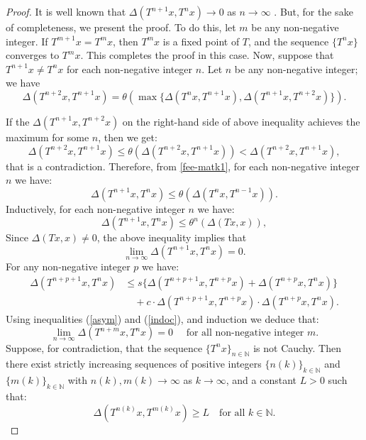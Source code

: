 \documentclass[pdflatex,sn-mathphys-num]{sn-jnl}%
\theoremstyle{thmstyleone}%
\theoremstyle{thmstyletwo}%
\theoremstyle{thmstylethree}%
\begin{document}
\begin{proof}
It is well known that \(\Delta(T^{n+1}x,T^{n}x)\to 0\) as \(n\to \infty\) \cite{hussain2018existence, karapinar2025some}. But, for the sake of completeness, we present the proof.  To do this, let \(m\) be any non-negative integer. If \(T^{m+1}x = T^m x\), then \(T^{m}x\) is a fixed point of \(T\), and the sequence \(\{T^n x\}\) converges to \(T^{m}x\). This completes the proof in this case. Now, suppose that \(T^{n+1}x \neq T^n x\) for each non-negative integer \(n\). Let \(n\) be any non-negative integer; we have
\[
\Delta(T^{n+2}x,T^{n+1}x)=\theta(\max\{\Delta(T^{n}x, T^{n+1}x),\Delta( T^{n+1}x,T^{n+2}x)\}).
\]

If the \(\Delta( T^{n+1}x,T^{n+2}x)\) on the right-hand side of above inequality achieves the maximum for some \(n\), then we get:
\[
\Delta(T^{n+2}x,T^{n+1}x)\le \theta(\Delta(T^{n+2}x,T^{n+1}x))<\Delta(T^{n+2}x,T^{n+1}x),
\]
that is a contradiction. Therefore,  from \eqref{fee-matk1}, for each non-negative integer \(n\) we have:
\[
\Delta(T^{n+1}x,T^{n}x)\le \theta(\Delta(T^{n}x,T^{n-1}x)).
\]
Inductively, for each non-negative integer \(n\) we have:
\[
\Delta(T^{n+1}x,T^{n}x)\le \theta^{n}(\Delta(Tx,x)),
\]
Since \(\Delta(Tx,x)\not = 0\), the above inequality implies that 
\begin{equation}\label{asym}
\lim_{n\to\infty}\Delta(T^{n+1}x,T^{n}x)=0.
\end{equation}
 For any non-negative integer \(p\) we have:
\begin{align}\label{indoc}
\Delta(T^{n+p+1}x,T^{n}x)&\le s\{\Delta(T^{n+p+1}x,T^{n+p}x)+\Delta(T^{n+p}x,T^{n}x)\}\nonumber\\
&\quad +c\cdot \Delta(T^{n+p+1}x,T^{n+p}x)\cdot \Delta(T^{n+p}x,T^{n}x).
\end{align}
Using inequalities (\ref{asym}) and (\ref{indoc}), and induction we deduce that:
\begin{equation}\label{induc}
\lim_{n\to\infty}\Delta(T^{n+m}x,T^{n}x)=0\quad \text{ for all non-negative integer } m.
\end{equation}
Suppose, for contradiction, that the sequence $\{T^n x\}_{n\in\mathbb{N}}$ is not Cauchy. Then there exist strictly increasing sequences of positive integers $\{n(k)\}_{k\in\mathbb{N}}$ and $\{m(k)\}_{k\in\mathbb{N}}$ with $n(k), m(k) \to \infty$ as $k \to \infty$, and a constant $L > 0$ such that:
\begin{equation}\label{b0}
    \Delta\left(T^{n(k)}x, T^{m(k)}x\right) \geq L \quad \text{for all } k \in \mathbb{N}.
\end{equation}

\end{proof}
\end{document}
